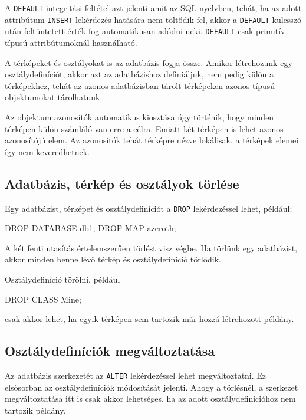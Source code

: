 A \texttt{DEFAULT} integritási feltétel azt jelenti amit az SQL nyelvben, tehát, ha az adott attribútum \texttt{INSERT} lekérdezés hatására nem töltődik fel, akkor a \texttt{DEFAULT} kulcsszó után feltüntetett érték fog automatikusan adódni neki. \texttt{DEFAULT} csak primitív típusú attribútumoknál használható.

A térképeket és osztályokat is az adatbázis fogja össze. Amikor létrehozunk egy osztálydefiníciót, akkor azt az adatbázishoz definiáljuk, nem pedig külön a térképekhez, tehát az azonos adatbázisban tárolt térképeken azonos típusú objektumokat tárolhatunk.

Az objektum azonosítók automatikus kiosztása úgy történik, hogy minden térképen külön számláló van erre a célra. Emiatt két térképen is lehet azonos azonosítójú elem. Az azonosítók tehát térképre nézve lokálisak, a térképek elemei így nem keveredhetnek.

\subsection{Adatbázis, térkép és osztályok törlése}

Egy adatbázist, térképet és osztálydefiníciót a \texttt{DROP} lekérdezéssel lehet, például:
\begin{sql}
DROP DATABASE db1;
DROP MAP azeroth;
\end{sql}
A két fenti utasítás értelemszerűen törlést visz végbe. Ha törlünk egy adatbázist, akkor minden benne lévő térkép és osztálydefiníció törlődik.

Osztálydefiníció törölni, például
\begin{sql}
DROP CLASS Mine;
\end{sql}
csak akkor lehet, ha egyik térképen sem tartozik már hozzá létrehozott példány.

\subsection{Osztálydefiníciók megváltoztatása}

Az adatbázis szerkezetét az \texttt{ALTER} lekérdezéssel lehet megváltoztatni. Ez elsősorban az osztálydefiníciók módosítását jelenti. Ahogy a törlésnél, a szerkezet megváltoztatása itt is csak akkor lehetséges, ha az adott osztálydefinícióhoz nem tartozik példány.

